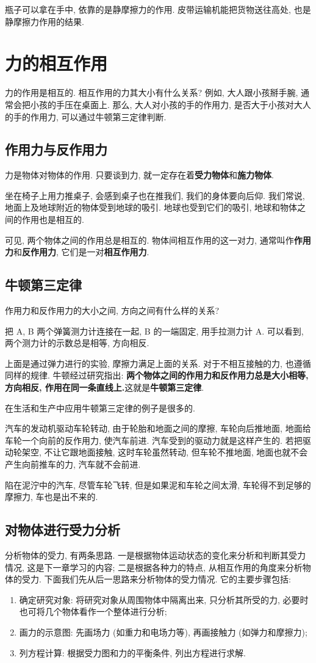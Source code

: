 \documentclass[UTF8,openany,fontset=fandol]{ctexbook}
\theoremstyle{chinesetextbook}
\begin{document}
瓶子可以拿在手中, 依靠的是静摩擦力的作用. 皮带运输机能把货物送往高处, 也是静摩擦力作用的结果.
\section{力的相互作用}
力的作用是相互的. 相互作用的力其大小有什么关系? 例如, 大人跟小孩掰手腕, 通常会把小孩的手压在桌面上. 那么, 大人对小孩的手的作用力, 是否大于小孩对大人的手的作用力, 可以通过牛顿第三定律判断.
\subsection{作用力与反作用力}
力是物体对物体的作用. 只要谈到力, 就一定存在着\textbf{受力物体}和\textbf{施力物体}.

坐在椅子上用力推桌子, 会感到桌子也在推我们, 我们的身体要向后仰. 我们常说, 地面上及地球附近的物体受到地球的吸引. 地球也受到它们的吸引, 地球和物体之间的作用也是相互的.

可见, 两个物体之间的作用总是相互的. 物体间相互作用的这一对力, 通常叫作\textbf{作用力}和\textbf{反作用力}, 它们是一对\textbf{相互作用力}.
\subsection{牛顿第三定律}
作用力和反作用力的大小之间, 方向之间有什么样的关系?

把 A, B 两个弹簧测力计连接在一起, B 的一端固定, 用手拉测力计 A. 可以看到, 两个测力计的示数总是相等, 方向相反.

上面是通过弹力进行的实验, 摩擦力满足上面的关系. 对于不相互接触的力, 也遵循同样的规律. 牛顿经过研究指出: \textbf{两个物体之间的作用力和反作用力总是大小相等, 方向相反, 作用在同一条直线上.}这就是\textbf{牛顿第三定律}.

在生活和生产中应用牛顿第三定律的例子是很多的.

汽车的发动机驱动车轮转动, 由于轮胎和地面之间的摩擦, 车轮向后推地面, 地面给车轮一个向前的反作用力, 使汽车前进. 汽车受到的驱动力就是这样产生的. 若把驱动轮架空, 不让它跟地面接触, 这时车轮虽然转动, 但车轮不推地面, 地面也就不会产生向前推车的力, 汽车就不会前进.

陷在泥泞中的汽车, 尽管车轮飞转, 但是如果泥和车轮之间太滑, 车轮得不到足够的摩擦力, 车也是出不来的.
\subsection{对物体进行受力分析}\label{sec:斜面物块问题}
分析物体的受力, 有两条思路. 一是根据物体运动状态的变化来分析和判断其受力情况, 这是下一章学习的内容; 二是根据各种力的特点, 从相互作用的角度来分析物体的受力. 下面我们先从后一思路来分析物体的受力情况. 它的主要步骤包括:
\begin{enumerate}
\item 确定研究对象: 将研究对象从周围物体中隔离出来, 只分析其所受的力, 必要时也可将几个物体看作一个整体进行分析;
\item 画力的示意图: 先画场力 (如重力和电场力等), 再画接触力 (如弹力和摩擦力);
\item 列方程计算: 根据受力图和力的平衡条件, 列出方程进行求解.
\end{enumerate}
\end{document}
